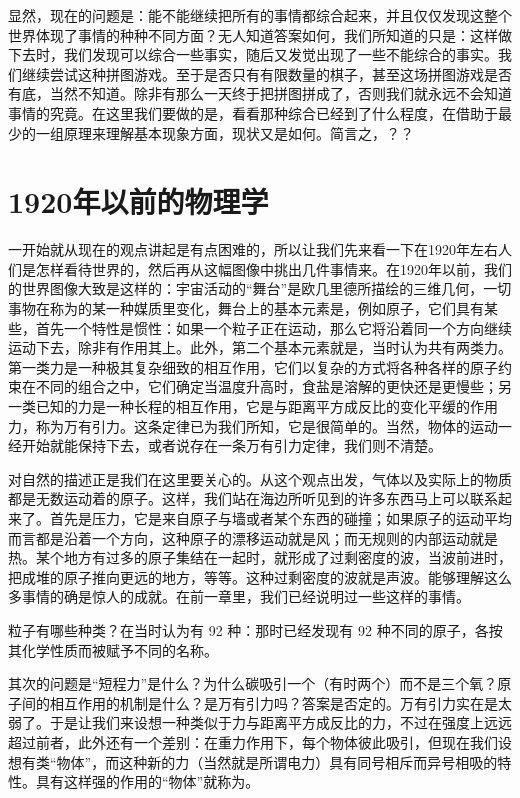 \documentclass[12pt,oneside]{book}
\begin{document}
\begin{common-format}
显然，现在的问题是：能不能继续把所有的事情都综合起来，并且仅仅发现这整个世界体现了事情的种种不同方面？无人知道答案如何，我们所知道的只是：这样做下去时，我们发现可以综合一些事实，随后又发觉出现了一些不能综合的事实。我们继续尝试这种拼图游戏。至于是否只有有限数量的棋子，甚至这场拼图游戏是否有底，当然不知道。除非有那么一天终于把拼图拼成了，否则我们就永远不会知道事情的究竟。在这里我们要做的是，看看那种综合已经到了什么程度，在借助于最少的一组原理来理解基本现象方面，现状又是如何。简言之，？？

\section{1920年以前的物理学}
一开始就从现在的观点讲起是有点困难的，所以让我们先来看一下在1920年左右人们是怎样看待世界的，然后再从这幅图像中挑出几件事情来。在1920年以前，我们的世界图像大致是这样的：宇宙活动的“舞台”是欧几里德所描绘的三维几何，一切事物在称为的某一种媒质里变化，舞台上的基本元素是，例如原子，它们具有某些，首先一个特性是惯性：如果一个粒子正在运动，那么它将沿着同一个方向继续运动下去，除非有作用其上。此外，第二个基本元素就是，当时认为共有两类力。第一类力是一种极其复杂细致的相互作用，它们以复杂的方式将各种各样的原子约束在不同的组合之中，它们确定当温度升高时，食盐是溶解的更快还是更慢些；另一类已知的力是一种长程的相互作用，它是与距离平方成反比的变化平缓的作用力，称为万有引力。这条定律已为我们所知，它是很简单的。当然，物体的运动一经开始就能保持下去，或者说存在一条万有引力定律，我们则不清楚。

对自然的描述正是我们在这里要关心的。从这个观点出发，气体以及实际上的物质都是无数运动着的原子。这样，我们站在海边所听见到的许多东西马上可以联系起来了。首先是压力，它是来自原子与墙或者某个东西的碰撞；如果原子的运动平均而言都是沿着一个方向，这种原子的漂移运动就是风；而无规则的内部运动就是热。某个地方有过多的原子集结在一起时，就形成了过剩密度的波，当波前进时，把成堆的原子推向更远的地方，等等。这种过剩密度的波就是声波。能够理解这么多事情的确是惊人的成就。在前一章里，我们已经说明过一些这样的事情。

粒子有哪些种类？在当时认为有 92 种：那时已经发现有 92 种不同的原子，各按其化学性质而被赋予不同的名称。

其次的问题是“短程力”是什么？为什么碳吸引一个（有时两个）而不是三个氧？原子间的相互作用的机制是什么？是万有引力吗？答案是否定的。万有引力实在是太弱了。于是让我们来设想一种类似于力与距离平方成反比的力，不过在强度上远远超过前者，此外还有一个差别：在重力作用下，每个物体彼此吸引，但现在我们设想有类“物体”，而这种新的力（当然就是所谓电力）具有同号相斥而异号相吸的特性。具有这样强的作用的“物体”就称为。


\end{common-format}
\end{document}
